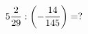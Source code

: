 \documentclass[preview]{standalone}
\begin{document}
\begin{align*}
5 { 2 \over 29 }  :  \left( - { 14 \over 145 } \right) = ?
\end{align*}
\end{document}
